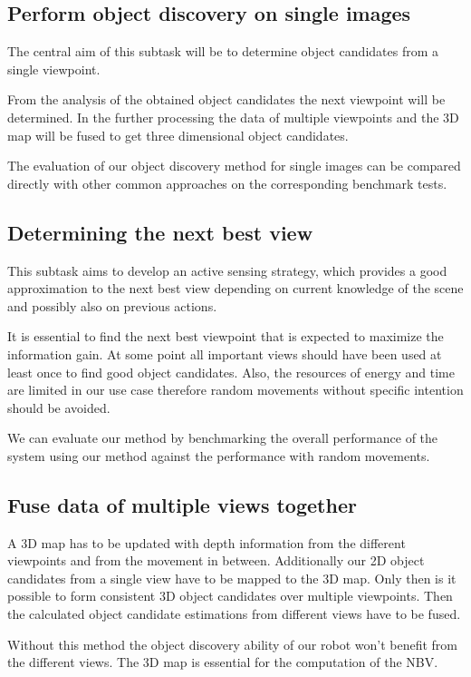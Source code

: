 \documentclass[a4paper,11pt,english]{article}
\begin{document}
\subsection{Perform object discovery on single images}
The central aim of this subtask will be to determine object candidates from a single viewpoint.

From the analysis of the obtained object candidates the next viewpoint will be determined.
In the further processing the data of multiple viewpoints and the 3D map will be fused to get three dimensional object candidates.

The evaluation of our object discovery method for single images can be compared directly with other common approaches on the corresponding benchmark tests.

\subsection{Determining the next best view}
This subtask aims to develop an active sensing strategy, which provides a good approximation to the next best view depending on current knowledge of the scene and possibly also on previous actions.

It is essential to find the next best viewpoint that is expected to maximize the information gain.
At some point all important views should have been used at least once to find good object candidates.
Also, the resources of energy and time are limited in our use case therefore random movements without specific intention should be avoided.

We can evaluate our method by benchmarking the overall performance of the system using our method against the performance with random movements.

\subsection{Fuse data of multiple views together}
A 3D map has to be updated with depth information from the different viewpoints and from the movement in between.
Additionally our 2D object candidates from a single view have to be mapped to the 3D map.
Only then is it possible to form consistent 3D object candidates over multiple viewpoints.
Then the calculated object candidate estimations from different views have to be fused.

Without this method the object discovery ability of our robot won't benefit from the different views.
The 3D map is essential for the computation of the NBV.
\end{document}
